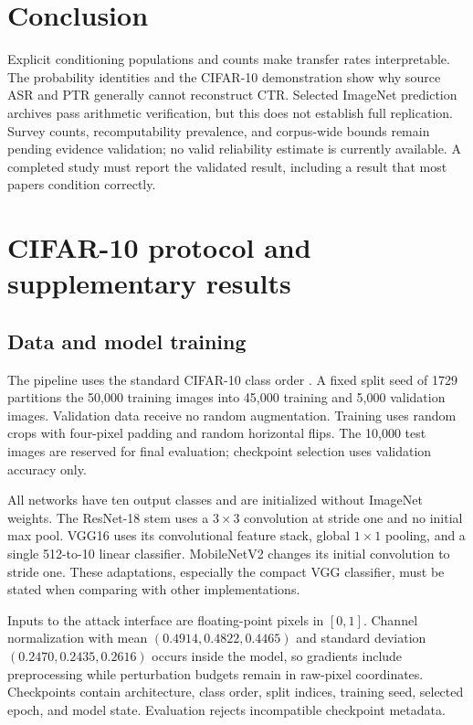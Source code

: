 \documentclass[10pt,twocolumn]{article}
\begin{document}
\section{Conclusion}
Explicit conditioning populations and counts make transfer rates interpretable. The probability identities and the CIFAR-10 demonstration show why source ASR and PTR generally cannot reconstruct CTR. Selected ImageNet prediction archives pass arithmetic verification, but this does not establish full replication. Survey counts, recomputability prevalence, and corpus-wide bounds remain pending evidence validation; no valid reliability estimate is currently available. A completed study must report the validated result, including a result that most papers condition correctly.

\appendix
\section{CIFAR-10 protocol and supplementary results}
\label{app:cifar}
\subsection{Data and model training}
The pipeline uses the standard CIFAR-10 class order \cite{cifar}. A fixed split seed of 1729 partitions the 50,000 training images into 45,000 training and 5,000 validation images. Validation data receive no random augmentation. Training uses random crops with four-pixel padding and random horizontal flips. The 10,000 test images are reserved for final evaluation; checkpoint selection uses validation accuracy only.

All networks have ten output classes and are initialized without ImageNet weights. The ResNet-18 stem uses a $3\times3$ convolution at stride one and no initial max pool. VGG16 uses its convolutional feature stack, global $1\times1$ pooling, and a single 512-to-10 linear classifier. MobileNetV2 changes its initial convolution to stride one. These adaptations, especially the compact VGG classifier, must be stated when comparing with other implementations.

Inputs to the attack interface are floating-point pixels in $[0,1]$. Channel normalization with mean $(0.4914,0.4822,0.4465)$ and standard deviation $(0.2470,0.2435,0.2616)$ occurs inside the model, so gradients include preprocessing while perturbation budgets remain in raw-pixel coordinates. Checkpoints contain architecture, class order, split indices, training seed, selected epoch, and model state. Evaluation rejects incompatible checkpoint metadata.
\end{document}
